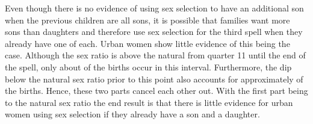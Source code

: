 \documentclass[12pt,letterpaper]{article}
\begin{document}

Even though there is no evidence of using sex selection to have an additional son when the 
previous children are all sons, it is possible that families want more sons than daughters 
and therefore use sex selection for the third spell when they already have one of each.
Urban women show little evidence of this being the case.
Although the sex ratio is above the natural from quarter 11 until the end of the spell,
only about  of the births occur in this interval.
Furthermore, the dip below the natural sex ratio prior to this point also accounts for
approximately  of the births.
Hence, these two parts cancel each other out.
With the first part being to the natural sex ratio the end result is that there
is little evidence for urban women using sex selection if they already have a son and
a daughter.

\end{document}
